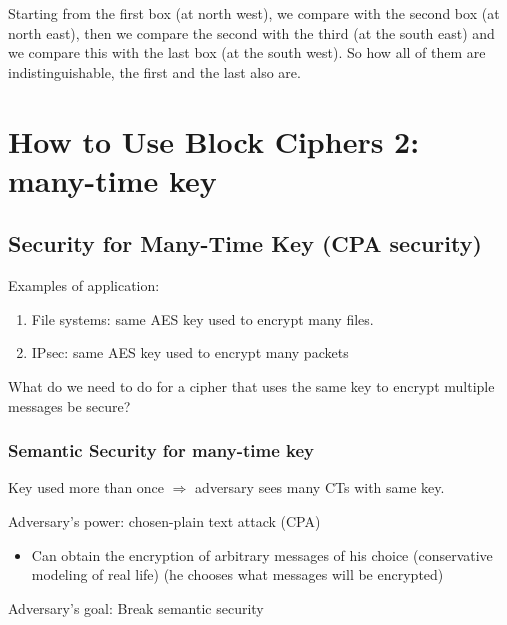 \documentclass[12pt]{book}
\begin{document}
\begin{center}
{
	}
\end{center}Starting from the first box (at north west), we compare with the second box (at north east), then we compare the second with the third (at the south east) and we compare this with the last box (at the south west). So how all of them are indistinguishable, the first and the last also are.

\newpage
\section{How to Use Block Ciphers 2: many-time key}
\subsection{Security for Many-Time Key (CPA security)}
Examples of application:
\begin{enumerate}
	\item File systems: same AES key used to encrypt many files.
	\item IPsec: same AES key used to encrypt many packets
\end{enumerate}
What do we need to do for a cipher that uses the same key to encrypt multiple messages be secure?
\subsubsection{Semantic Security for many-time key}
Key used more than once $\Rightarrow$ adversary sees many CTs with same key.

Adversary's power: chosen-plain text attack (CPA)
\begin{itemize}
	\item Can obtain the encryption of arbitrary messages of his choice (conservative modeling of real life) (he chooses what messages will be encrypted)
\end{itemize}

Adversary's goal: Break semantic security
\end{document}
